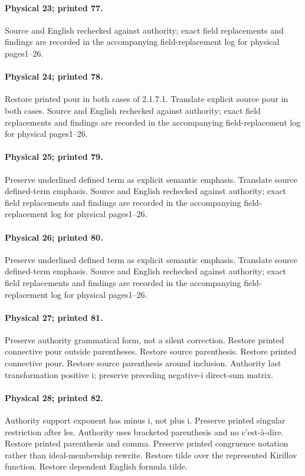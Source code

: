 \documentclass[10pt,a4paper]{article}
\begin{document}
\paragraph{Physical 23; printed 77.} Source and English rechecked against authority; exact field replacements and findings are recorded in the accompanying field-replacement log for physical pages1--26.
\paragraph{Physical 24; printed 78.} Restore printed pour in both cases of 2.1.7.1. Translate explicit source pour in both cases. Source and English rechecked against authority; exact field replacements and findings are recorded in the accompanying field-replacement log for physical pages1--26.
\paragraph{Physical 25; printed 79.} Preserve underlined defined term as explicit semantic emphasis. Translate source defined-term emphasis. Source and English rechecked against authority; exact field replacements and findings are recorded in the accompanying field-replacement log for physical pages1--26.
\paragraph{Physical 26; printed 80.} Preserve underlined defined term as explicit semantic emphasis. Translate source defined-term emphasis. Source and English rechecked against authority; exact field replacements and findings are recorded in the accompanying field-replacement log for physical pages1--26.
\paragraph{Physical 27; printed 81.} Preserve authority grammatical form, not a silent correction. Restore printed connective pour outside parentheses. Restore source parenthesis. Restore printed connective pour. Restore source parenthesis around inclusion. Authority last transformation positive i; preserve preceding negative-i direct-sum matrix.
\paragraph{Physical 28; printed 82.} Authority support exponent has minus i, not plus i. Preserve printed singular restriction after les. Authority uses bracketed parenthesis and no c'est-à-dire. Restore printed parenthesis and comma. Preserve printed congruence notation rather than ideal-membership rewrite. Restore tilde over the represented Kirillov function. Restore dependent English formula tilde.
\end{document}
